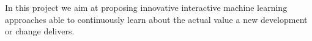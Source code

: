 \documentclass[12pt]{article}
\newcommand{\ugh}[1]{\textcolor{red}{\uwave{#1}}} %
\newcommand{\nb}[2]{
    \fcolorbox{gray}{yellow}{\bfseries\sffamily\scriptsize#1}
    {\sf\small$\blacktriangleright$\textit{#2}$\blacktriangleleft$}
   }
\newcommand{\ugh}[1]{#1} %
\newcommand{\nb}[2]{}
\newcommand\ivica[1]{\nb{Ivica}{#1}}
\begin{document}
%
In this project we aim at proposing innovative interactive machine learning~\cite{interactiveMachineLearning} approaches able to %
continuously learn about the actual value a new development or change delivers.  %
\end{document}

